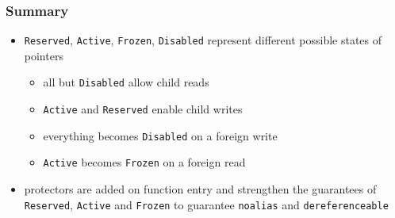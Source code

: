 \begin{frame}
    \frametitle{Summary}
    \begin{itemize}
        \item \texttt{Reserved}, \texttt{Active}, \texttt{Frozen}, \texttt{Disabled}
            represent different possible states of pointers
            \begin{itemize}
                \item all but \texttt{Disabled} allow child reads
                \item \texttt{Active} and \texttt{Reserved} enable child writes
                \item everything becomes \texttt{Disabled} on a foreign write
                \item \texttt{Active} becomes \texttt{Frozen} on a foreign read
            \end{itemize}
        \item protectors are added on function entry and strengthen the guarantees
            of \texttt{Reserved}, \texttt{Active} and \texttt{Frozen} to guarantee \texttt{noalias}
            and \texttt{dereferenceable}
    \end{itemize}
\end{frame}
